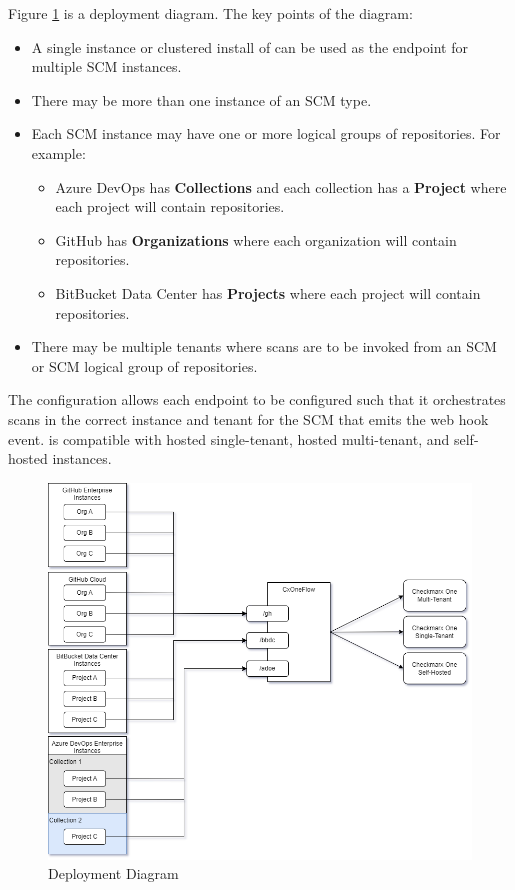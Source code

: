 Figure \ref{fig:cxoneflow-deployment} is a \cxoneflow deployment diagram. The key points of the diagram:

\begin{itemize}
    \item A single instance or clustered install of \cxoneflow can be used as the endpoint for multiple
    SCM instances.
    \item There may be more than one instance of an SCM type.
    \item Each SCM instance may have one or more logical groups of repositories.  For example:
    \begin{itemize}
        \item Azure DevOps has \textbf{Collections} and each collection has a \textbf{Project} where
        each project will contain repositories.
        \item GitHub has \textbf{Organizations} where each organization will contain repositories.
        \item BitBucket Data Center has \textbf{Projects} where each project will contain repositories.
    \end{itemize}
    \item There may be multiple \cxone tenants where scans are to be invoked from an SCM or SCM
    logical group of repositories.
\end{itemize}

The \cxoneflow configuration allows each endpoint to be configured such that it orchestrates
scans in the correct \cxone instance and tenant for the SCM that emits the web hook event.
\cxoneflow is compatible with \cxone hosted single-tenant, hosted multi-tenant, and self-hosted
instances.

\begin{figure}[ht]
    \includegraphics[width=\textwidth]{graphics/cxoneflow-deployment.png}
    \caption{\cxoneflow Deployment Diagram}
    \label{fig:cxoneflow-deployment}
\end{figure}

